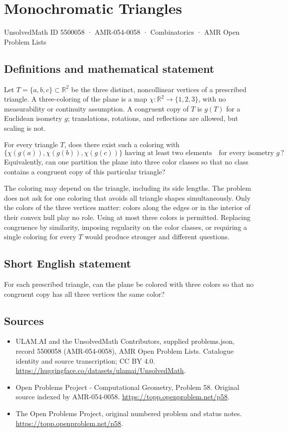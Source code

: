 \documentclass[11pt,a4paper]{article}
\begin{document}
\section*{Monochromatic Triangles}\label{5500058}
{\small UnsolvedMath ID 5500058 · AMR-054-0058 · Combinatorics · AMR Open Problem Lists}
\subsection{Definitions and mathematical statement}
Let $T=\{a,b,c\}\subset\mathbb R^2$ be the three distinct,
noncollinear vertices of a prescribed triangle. A three-coloring
of the plane is a map $\chi:\mathbb R^2\to\{1,2,3\}$, with no
measurability or continuity assumption. A congruent copy of $T$
is $g(T)$ for a Euclidean isometry $g$; translations, rotations,
and reflections are allowed, but scaling is not.

For every triangle $T$, does there exist such a coloring with
\[
             \{\chi(g(a)),\chi(g(b)),\chi(g(c))\}
                     \text{ having at least two elements}
                 \quad\text{for every isometry }g\,?
\]
Equivalently, can one partition the plane into three color
classes so that no class contains a congruent copy of this
particular triangle?

The coloring may depend on the triangle, including its side
lengths. The problem does not ask for one coloring that avoids
all triangle shapes simultaneously. Only the colors of the
three vertices matter: colors along the edges or in the
interior of their convex hull play no role. Using at most three
colors is permitted. Replacing congruence by similarity, imposing
regularity on the color classes, or requiring a single coloring
for every $T$ would produce stronger and different questions.
\subsection{Short English statement}
For each prescribed triangle, can the plane be colored with three colors so that no congruent copy has all three vertices the same color?
\subsection{Sources}
\begin{itemize}
\item[S1] ULAM.AI and the UnsolvedMath Contributors, supplied problems.json, record 5500058 (AMR-054-0058), AMR Open Problem Lists. Catalogue identity and source transcription; CC BY 4.0.
\url{https://huggingface.co/datasets/ulamai/UnsolvedMath}.
\item[S2] Open Problems Project - Computational Geometry, Problem 58. Original source indexed by AMR-054-0058.
\url{https://topp.openproblem.net/p58}.
\item[S3] The Open Problems Project, original numbered problem and status notes.
\url{https://topp.openproblem.net/p58}.
\end{itemize}
\end{document}
